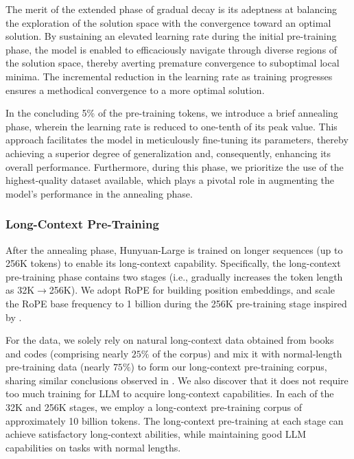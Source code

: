 \documentclass{article}
\begin{document}
The merit of the extended phase of gradual decay is its adeptness at balancing the exploration of the solution space with the convergence toward an optimal solution. By sustaining an elevated learning rate during the initial pre-training phase, the model is enabled to efficaciously navigate through diverse regions of the solution space, thereby averting premature convergence to suboptimal local minima. The incremental reduction in the learning rate as training progresses ensures a methodical convergence to a more optimal solution.

In the concluding 5\% of the pre-training tokens, we introduce a brief annealing phase, wherein the learning rate is reduced to one-tenth of its peak value. This approach facilitates the model in meticulously fine-tuning its parameters, thereby achieving a superior degree of generalization and, consequently, enhancing its overall performance. Furthermore, during this phase, we prioritize the use of the highest-quality dataset available, which plays a pivotal role in augmenting the model's performance in the annealing phase.

\subsubsection{Long-Context Pre-Training}
After the annealing phase, Hunyuan-Large is trained on longer sequences (up to 256K tokens) to enable its long-context capability. Specifically, the long-context pre-training phase contains two stages (i.e., gradually increases the token length as 32K$\rightarrow$256K). We adopt RoPE \citep{su2024roformer} for building position embeddings, and scale the RoPE base frequency to 1 billion during the 256K pre-training stage inspired by \cite{xiong2023effective}.

For the data, we solely rely on natural long-context data obtained from books and codes (comprising nearly $25\%$ of the corpus) and mix it with normal-length pre-training data (nearly $75\%$) to form our long-context pre-training corpus, sharing similar conclusions observed in \cite{gao2024train}. We also discover that it does not require too much training for LLM to acquire long-context capabilities. In each of the 32K and 256K stages, we employ a long-context pre-training corpus of approximately 10 billion tokens. The long-context pre-training at each stage can achieve satisfactory long-context abilities, while maintaining good LLM capabilities on tasks with normal lengths.
\end{document}
